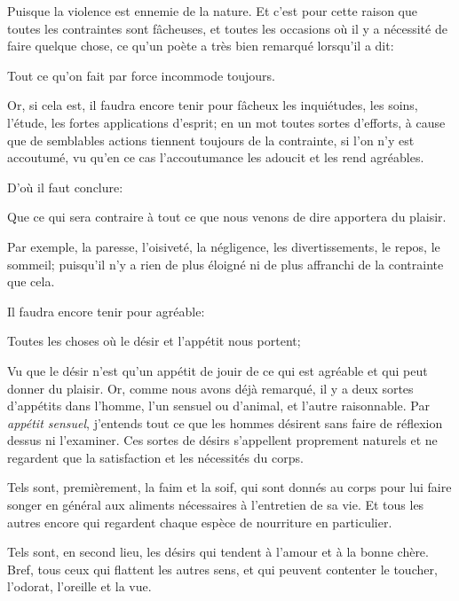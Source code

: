 Puisque la violence est ennemie de la nature. Et c'est pour cette raison que toutes les contraintes sont fâcheuses,
et toutes les occasions où il y a nécessité de faire quelque chose, ce qu'un poète a très bien remarqué lorsqu'il
a dit:

\begin{emphpar}
	Tout ce qu'on fait par force incommode toujours.
\end{emphpar}

Or, si cela est, il faudra encore tenir pour fâcheux les inquiétudes, les soins, l'étude, les fortes applications
d'esprit; en un mot toutes sortes d'efforts, à cause que de semblables actions tiennent toujours de la contrainte, 
si l'on n'y est accoutumé, vu qu'en ce cas l'accoutumance les adoucit et les rend agréables.

\bigbreak

D'où il faut conclure:

\begin{lieu}
	Que ce qui sera contraire à tout ce que nous venons de dire apportera du plaisir.
\end{lieu}

Par exemple, la paresse, l'oisiveté, la négligence, les divertissements, le repos, le sommeil; puisqu'il n'y a
rien de plus éloigné ni de plus affranchi de la contrainte que cela.

\bigbreak

Il faudra encore tenir pour agréable:

\begin{lieu}
	Toutes les choses où le désir et l'appétit nous portent;
\end{lieu}

Vu que le désir n'est qu'un appétit de jouir de ce qui est agréable et qui peut donner du plaisir. Or, comme nous
avons déjà remarqué, il y a deux sortes d'appétits dans l'homme, l'un sensuel ou d'animal, et l'autre raisonnable.
Par \emph{appétit sensuel}, j'entends tout ce que les hommes désirent sans faire de réflexion dessus ni l'examiner.
Ces sortes de désirs s'appellent proprement naturels et ne regardent que la satisfaction et les nécessités du corps.

Tels sont, premièrement, la faim et la soif, qui sont donnés au corps pour lui faire songer en général aux
aliments nécessaires à l'entretien de sa vie. Et tous les autres encore qui regardent chaque espèce de nourriture
en particulier.

Tels sont, en second lieu, les désirs qui tendent à l'amour et à la bonne chère. Bref, tous ceux qui flattent les
autres sens, et qui peuvent contenter le toucher, l'odorat, l'oreille et la vue.

